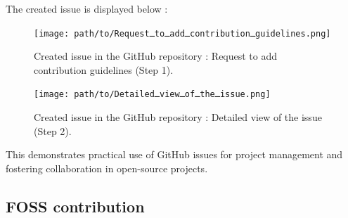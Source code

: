 \documentclass[12pt]{article}
\begin{document}
            The created issue is displayed below :

            \begin{figure}[H]
                \centering
                \texttt{[image: path/to/Requestـtoـaddـcontributionـguidelines.png]}
                \caption{Created issue in the GitHub repository : Request to add contribution guidelines (Step 1).}
            \end{figure}

            \begin{figure}[H]
                \centering
                \texttt{[image: path/to/Detailedـviewـofـtheـissue.png]}
                \caption{Created issue in the GitHub repository : Detailed view of the issue (Step 2).}
            \end{figure}

            This demonstrates practical use of GitHub issues for project management and fostering collaboration in open-source projects.

    \subsection{FOSS contribution}
\end{document}

